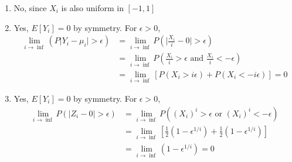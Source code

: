 \documentclass[../../probability-notes.tex]{subfiles}
\begin{document}
        \begin{enumerate}
            \item No, since $X_{i}$ is also uniform in $[-1,1]$
            \item Yes, $E[Y_{i}] = 0$ by symmetry. For $\epsilon > 0$,
            \begin{align*}
                \lim_{i \to \inf}(P\vert Y_{i} - \mu_{i} \vert > \epsilon) &= \lim_{i \to \inf} P(\vert \frac{X_{i}}{i} - 0 \vert > \epsilon)\\
                &= \lim_{i \to \inf} P(\frac{X_{i}}{i} > \epsilon \text{ and } \frac{X_{i}}{i} < -\epsilon)\\
                &= \lim_{i \to \inf} [P(X_{i} > i\epsilon) + P(X_{i} < -i\epsilon)] = 0
            \end{align*}
            \item Yes, $E[Y_{i}] = 0$ by symmetry. For $\epsilon > 0$,
            \begin{align*}
                \lim_{i \to \inf}P(\vert Z_{i} - 0 \vert > \epsilon) &= \lim_{i \to \inf}P((X_{i})^{i} > \epsilon \text{ or } (X_{i})^{i} < -\epsilon)\\
                &= \lim_{i \to \inf} [\frac{1}{2}(1 - \epsilon^{1/i}) + \frac{1}{2}(1 - \epsilon^{1/i})]\\
                &= \lim_{i \to \inf}(1 - \epsilon^{1/i}) = 0
            \end{align*}
        \end{enumerate}
\end{document}
